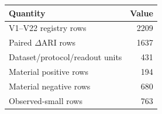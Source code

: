 \begin{tabular}{lr}
\toprule
Quantity & Value \\
\midrule
V1--V22 registry rows & 2209 \\
Paired $\Delta$ARI rows & 1637 \\
Dataset/protocol/readout units & 431 \\
Material positive rows & 194 \\
Material negative rows & 680 \\
Observed-small rows & 763 \\
\bottomrule
\end{tabular}
